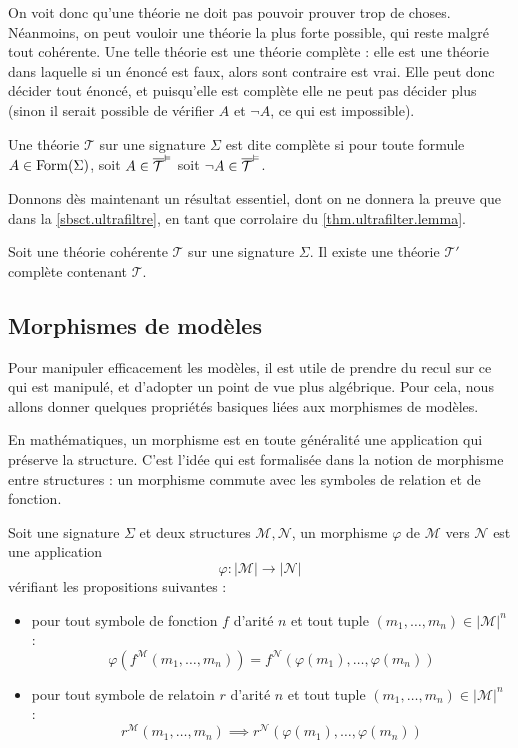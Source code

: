 On voit donc qu'une théorie ne doit pas pouvoir prouver trop de choses.
Néanmoins, on peut vouloir une théorie la plus forte possible, qui reste malgré
tout cohérente. Une telle théorie est une théorie complète : elle est une théorie
dans laquelle si un énoncé est faux, alors sont contraire est vrai. Elle peut
donc décider tout énoncé, et puisqu'elle est complète elle ne peut pas décider
plus (sinon il serait possible de vérifier $A$ et $\lnot A$, ce qui est
impossible).

\begin{definition}
  Une théorie $\mathcal T$ sur une signature $\Sigma$ est dite complète si pour
  toute formule $A\in\operatorname{Form}(\Sigma)$, soit $A\in \overline{\mathcal T}^{\vDash}$ soit
  $\lnot A \in \overline{\mathcal T}^{\vDash}$.
\end{definition}

Donnons dès maintenant un résultat essentiel, dont on ne donnera la preuve que
dans la \cref{sbsct.ultrafiltre}, en tant que corrolaire du
\cref{thm.ultrafilter.lemma}.

\begin{theorem}\label{thm.completion}
  Soit une théorie cohérente $\mathcal T$ sur une signature $\Sigma$. Il existe
  une théorie $\mathcal T'$ complète contenant $\mathcal T$.
\end{theorem}

\subsection{Morphismes de modèles}

Pour manipuler efficacement les modèles, il est utile de prendre du recul sur ce
qui est manipulé, et d'adopter un point de vue plus algébrique. Pour cela, nous
allons donner quelques propriétés basiques liées aux morphismes de modèles.

En mathématiques, un morphisme est en toute généralité une application qui
préserve la structure. C'est l'idée qui est formalisée dans la notion de
morphisme entre structures : un morphisme commute avec les symboles de relation
et de fonction.

\begin{definition}
  Soit une signature $\Sigma$ et deux structures $\mathcal M,\mathcal N$, un
  morphisme $\varphi$ de $\mathcal M$ vers $\mathcal N$ est une application
  \[\varphi : |\mathcal M|\longrightarrow |\mathcal N|\]
  vérifiant les propositions suivantes :
  \begin{itemize}
  \item pour tout symbole de fonction $f$ d'arité $n$ et tout tuple
    $(m_1,\ldots,m_n)\in|\mathcal M|^n$ :
    \[\varphi(f^{\mathcal M}(m_1,\ldots,m_n))
    = f^{\mathcal N}(\varphi(m_1),\ldots,\varphi(m_n))\]
  \item pour tout symbole de relatoin $r$ d'arité $n$ et tout tuple
    $(m_1,\ldots,m_n)\in|\mathcal M|^n$ :
    \[r^{\mathcal M}(m_1,\ldots,m_n) \implies
    r^{\mathcal N}(\varphi(m_1),\ldots,\varphi(m_n)) \]
  \end{itemize}
\end{definition}

